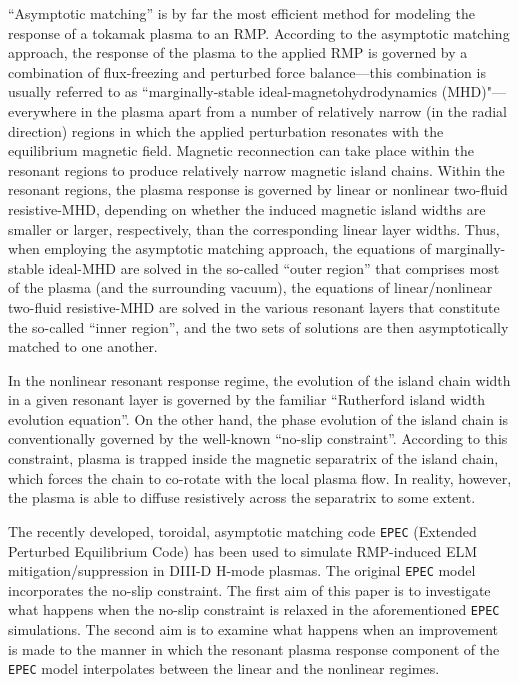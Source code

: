 \documentclass[12pt,prb,aps]{revtex4-1}
\begin{document}
``Asymptotic matching'' is by far the most efficient method for modeling the response of a tokamak plasma to an RMP.\cite{fkr,rfa, am1,am2,am3} 
According to the asymptotic matching approach, the response of the plasma to the applied RMP is governed by a combination of flux-freezing and
perturbed force balance---this combination is usually referred to as ``marginally-stable ideal-magnetohydrodynamics (MHD)"---everywhere in the plasma apart from a number of relatively narrow (in the radial direction) regions in which the applied
perturbation resonates with the equilibrium magnetic field. Magnetic reconnection can take place within the resonant regions to
produce relatively narrow magnetic island chains. Within the resonant regions, the plasma response is governed by  linear or nonlinear 
 two-fluid resistive-MHD, depending on whether the induced magnetic island widths are smaller or larger, respectively, than the corresponding linear layer widths. 
 Thus, when employing the asymptotic matching approach, the equations of marginally-stable ideal-MHD
are solved in the so-called ``outer region'' that comprises most of the plasma (and the surrounding vacuum), the equations of 
linear/nonlinear two-fluid resistive-MHD are solved in the various resonant layers that constitute the so-called ``inner region'', and the two
sets of solutions are then asymptotically matched to one another. 

In the nonlinear resonant response regime, the evolution of the island chain width in a given resonant layer is governed by the familiar ``Rutherford island width evolution equation''.\cite{ruth,ruth1}
On the other hand, the phase evolution of the island chain is conventionally governed by the well-known ``no-slip constraint''.\cite{rfa} According to this constraint,  plasma is trapped inside the
magnetic separatrix of the island chain,
which forces the chain to co-rotate with the local plasma flow. In reality, however, the plasma
is able to diffuse resistively across the separatrix to some extent.\cite{slip1,slip2} 

The recently developed, toroidal, asymptotic matching code {\tt EPEC} (Extended Perturbed Equilibrium Code) has been used to simulate 
RMP-induced ELM mitigation/suppression in DIII-D H-mode plasmas.\cite{rftor,rftor1}
The original {\tt EPEC} model incorporates the no-slip constraint.
The first aim of this paper is to investigate 
what happens when the no-slip constraint is relaxed in the aforementioned {\tt EPEC} simulations.
 The second aim is to examine what happens when an improvement is made to the manner in which the resonant
plasma response component of the {\tt EPEC} model interpolates between the linear and the nonlinear regimes. 
\end{document}
